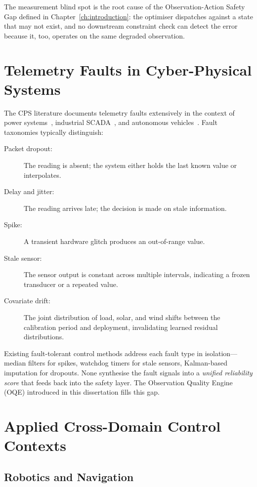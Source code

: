 The measurement blind spot is the root cause of the Observation-Action
Safety Gap defined in Chapter~\ref{ch:introduction}: the optimiser
dispatches against a state that may not exist, and no downstream
constraint check can detect the error because it, too, operates on the
same degraded observation.

\section{Telemetry Faults in Cyber-Physical Systems}

The CPS literature documents telemetry faults extensively in the context
of power systems~\cite{liang2017review}, industrial
SCADA~\cite{cardenas2011attacks}, and autonomous
vehicles~\cite{sun2020adversarial}.  Fault taxonomies typically
distinguish:

\begin{description}
  \item[Packet dropout:] The reading is absent; the system either holds
    the last known value or interpolates.
  \item[Delay and jitter:] The reading arrives late; the decision is made
    on stale information.
  \item[Spike:] A transient hardware glitch produces an out-of-range
    value.
  \item[Stale sensor:] The sensor output is constant across multiple
    intervals, indicating a frozen transducer or a repeated value.
  \item[Covariate drift:] The joint distribution of load, solar, and wind
    shifts between the calibration period and deployment, invalidating
    learned residual distributions.
\end{description}

Existing fault-tolerant control methods address each fault type in
isolation---median filters for spikes, watchdog timers for stale
sensors, Kalman-based imputation for dropouts.  None synthesise the
fault signals into a \emph{unified reliability score} that feeds back
into the safety layer.  The Observation Quality Engine (OQE) introduced
in this dissertation fills this gap.

\section{Applied Cross-Domain Control Contexts}

\subsection{Robotics and Navigation}

